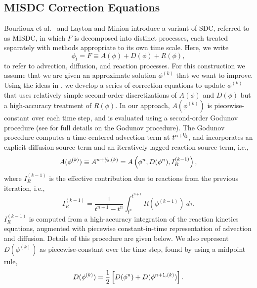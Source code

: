 \subsection{MISDC Correction Equations}
Bourlioux et al.~\cite{BLM:2003} and Layton and Minion \cite{Layton:2004}
introduce a variant of SDC, referred to as MISDC, in which $F$ is decomposed into distinct
processes, each treated separately with methods appropriate to its own time scale.  Here, we write
\begin{equation}
\phi_t = F \equiv A(\phi) + D(\phi) + R(\phi),\label{eq:multi}
\end{equation}
to refer to advection, diffusion, and reaction processes.
For this construction we assume that we are given an approximate solution $\phi^{(k)}$ that
we want to improve. 
Using the ideas in \cite{BLM:2003,Layton:2004}, we develop 
a series of correction equations to update $\phi^{(k)}$ that uses relatively
simple second-order discretizations of $A(\phi)$ and $D(\phi)$ but a high-accuracy 
treatment of $R(\phi)$.  In our approach, $A(\phi^{(k)})$ is piecewise-constant over 
each time step, and is evaluated using a second-order Godunov procedure 
(see \cite{almgren-iamr} for full details on the Godunov procedure).
The Godunov procedure computes a time-centered 
advection term at $t^{n+\myhalf}$, and incorporates an explicit diffusion source term and an 
iteratively lagged reaction source term, i.e.,
\begin{equation}
A(\phi^{(k)}) \equiv A^{n+\myhalf,(k)} = A\left(\phi^n,D(\phi^n),I_R^{(k-1)}\right),
\end{equation}
where $I_R^{(k-1)}$ is the effective contribution due to reactions from the previous iteration, i.e.,
\begin{equation}
I_R^{(k-1)} = \frac{1}{t^{n+1}-t^n}\int_{t^n}^{t^{n+1}} R(\phi^{(k-1)})~d\tau.\label{eq:IR}
\end{equation}
$I_R^{(k-1)}$ is computed from a high-accuracy
integration of the reaction kinetics equations,
augmented with piecewise constant-in-time representation of advection and diffusion.
Details of this procedure are given below.
We also represent $D(\phi^{(k)})$ as piecewise-constant 
over the time step, found by using a midpoint rule,
\begin{equation}
D(\phi^{(k)}) = \frac{1}{2}\left[D(\phi^n) + D(\phi^{n+1,(k)})\right].\label{eq:D^k}
\end{equation}

